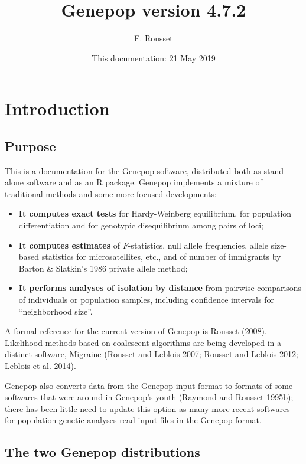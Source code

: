 \documentclass[12pt,]{book}
\title{Genepop version 4.7.2}
\author{F. Rousset}
\date{This documentation: 21 May 2019}
\begin{document}
\maketitle

{
\setcounter{tocdepth}{1}
\tableofcontents
}
\chapter{Introduction}\label{introduction}

\section{Purpose}\label{purpose}

This is a documentation for the Genepop software, distributed both as
stand-alone software and as an R package. Genepop implements a mixture
of traditional methods and some more focused developments:

\begin{itemize}
\item
  \textbf{It computes exact tests} for Hardy-Weinberg equilibrium, for
  population differentiation and for genotypic disequilibrium among
  pairs of loci;
\item
  \textbf{It computes estimates} of \(F\)-statistics, null allele
  frequencies, allele size-based statistics for microsatellites, etc.,
  and of number of immigrants by Barton \& Slatkin's 1986 private allele
  method;
\item
  \textbf{It performs analyses of isolation by distance} from pairwise
  comparisons of individuals or population samples, including confidence
  intervals for ``neighborhood size''.
\end{itemize}

A formal reference for the current version of Genepop is
\href{http://dx.doi.org/10.1111/j.1471-8286.2007.01931.x}{Rousset
(2008)}. Likelihood methods based on coalescent algorithms are being
developed in a distinct software, Migraine (Rousset and Leblois 2007;
Rousset and Leblois 2012; Leblois et al. 2014).

Genepop also converts data from the Genepop input format to formats of
some softwares that were around in Genepop's youth (Raymond and Rousset
1995b); there has been little need to update this option as many more
recent softwares for population genetic analyses read input files in the
Genepop format.

\section{The two Genepop
distributions}\label{the-two-genepop-distributions}
\end{document}
